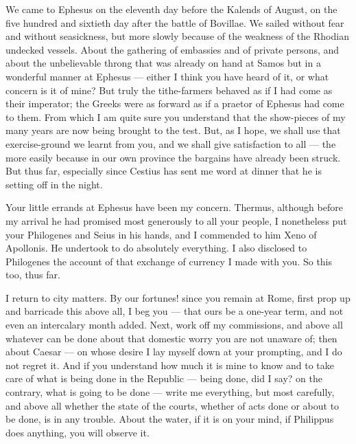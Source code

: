 

 We came to Ephesus on the eleventh day before the Kalends of August, on the five hundred and sixtieth day after the battle of Bovillae. We sailed without fear and without seasickness, but more slowly because of the weakness of the Rhodian undecked vessels. About the gathering of embassies and of private persons, and about the unbelievable throng that was already on hand at Samos but in a wonderful manner at Ephesus --- either I think you have heard of it, or what concern is it of mine? But truly the tithe-farmers behaved as if I had come as their imperator; the Greeks were as forward as if a praetor of Ephesus had come to them. From which I am quite sure you understand that the show-pieces of my many years are now being brought to the test. But, as I hope, we shall use that exercise-ground we learnt from you, and we shall give satisfaction to all --- the more easily because in our own province the bargains have already been struck. But thus far, especially since Cestius has sent me word at dinner that he is setting off in the night.

 Your little errands at Ephesus have been my concern. Thermus, although before my arrival he had promised most generously to all your people, I nonetheless put your Philogenes and Seius in his hands, and I commended to him Xeno of Apollonis. He undertook to do absolutely everything. I also disclosed to Philogenes the account of that exchange of currency I made with you. So this too, thus far.

 I return to city matters. By our fortunes! since you remain at Rome, first prop up and barricade this above all, I beg you --- that ours be a one-year term, and not even an intercalary month added. Next, work off my commissions, and above all whatever can be done about that domestic worry you are not unaware of; then about Caesar --- on whose desire I lay myself down at your prompting, and I do not regret it. And if you understand how much it is mine to know and to take care of what is being done in the Republic --- being done, did I say? on the contrary, what is going to be done --- write me everything, but most carefully, and above all whether the state of the courts, whether of acts done or about to be done, is in any trouble. About the water, if it is on your mind, if Philippus does anything, you will observe it.

